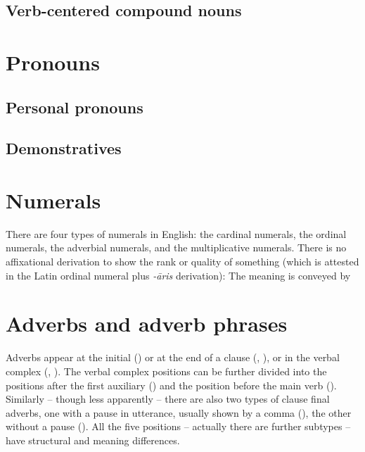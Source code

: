\documentclass[UTF8, a4paper, oneside, scheme=plain]{ctexrep}
\newcommand{\corpus}[1]{\emph{#1}}
\begin{document}
\subsection{Verb-centered compound nouns}\label{sec:pos.noun.compound.verb-centered}

\section{Pronouns}

\subsection{Personal pronouns}

\subsection{Demonstratives}

\section{Numerals}

There are four types of numerals in English:
the cardinal numerals, 
the ordinal numerals,
the adverbial numerals,
and the multiplicative numerals.
There is no affixational derivation to show the rank or quality of something 
(which is attested in the Latin ordinal numeral plus \corpus{-āris} derivation):
The meaning is conveyed by 

\section{Adverbs and adverb phrases}

Adverbs appear at the initial () or
at the end of a clause (, ), 
or in the verbal complex (, ).
The verbal complex positions can be further divided into 
the positions after the first auxiliary ()
and the position before the main verb ().
Similarly -- though less apparently -- 
there are also two types of clause final adverbs,
one with a pause in utterance, usually shown by a comma (),
the other without a pause ().
All the five positions -- actually there are further subtypes -- have structural and meaning differences.
\end{document}
